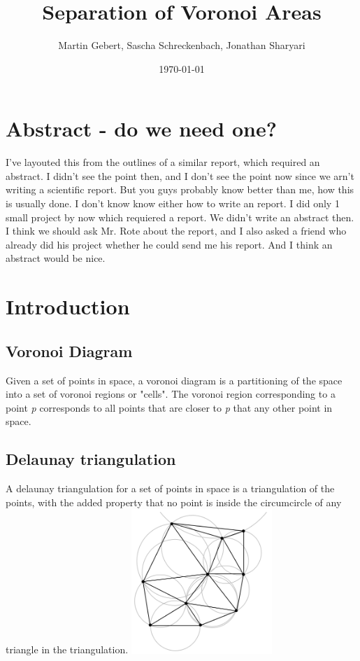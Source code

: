 \documentclass[a4paper,12pt]{article}
\title{\textbf{Separation of Voronoi Areas}}
\author{Martin Gebert, Sascha Schreckenbach, Jonathan Sharyari}  %
\date{\today}
\begin{document}
\maketitle

\section{Abstract - do we need one?}
I've layouted this from the outlines of a similar report, which required an abstract. I didn't see the point then, and I don't see the point now since we arn't writing a scientific report. But you guys probably know better than me, how this is usually done.
I don't know know either how to write an report. I did only 1 small project by now which requiered a report. We didn't write an abstract then. I think we should ask Mr. Rote about the report, and I also asked a friend who already did his project whether he could send me his report. And I think an abstract would be nice.

\section{Introduction}
\subsection{Voronoi Diagram}
Given a set of points in space, a voronoi diagram is a partitioning of the space into a set of voronoi regions or "cells". The voronoi region corresponding to a point \emph{p} corresponds to all points that are closer to \emph{p} that any other point in space.


\subsection{Delaunay triangulation}
A delaunay triangulation for a set of points in space is a triangulation of the points, with the added property that no point is inside the circumcircle of any triangle in the triangulation.
\includegraphics[width=0.4\textwidth]{pictures/Delaunay_circumcircles.png}
\end{document}
